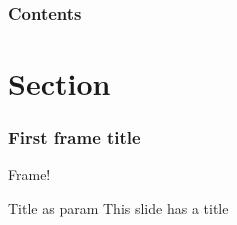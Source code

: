 \documentclass{beamer}
\begin{document}
\begin{frame}
    \frametitle{Contents}
    \tableofcontents
\end{frame}

\section{Section}

\begin{frame}
    \frametitle{First frame title}
    Frame!
\end{frame}

\begin{frame}{Title as param}
    This slide has a title
\end{frame}
\end{document}

